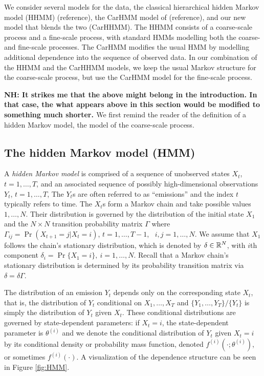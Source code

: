 %



We consider several models for the data, the classical hierarchical hidden Markov model (HHMM) (reference), the CarHMM model of (reference), and our new model that blends the two (CarHHMM).
The HHMM consists of a coarse-scale process and a fine-scale process, with standard HMMs modelling both the coarse- and fine-scale processes.
The CarHMM  modifies the usual HMM by modelling additional dependence into the sequence of observed data.
In our combination of the HHMM and the CarHHMM models, we keep the usual Markov structure for the coarse-scale process, but use the CarHMM model for the fine-scale process.

{\bf{NH: It strikes me that the above might belong in the introduction.  In that case, the what appears above in this section would be modified to something much shorter. 
}} 
We first remind the reader of the definition of a hidden Markov model,   the model of the coarse-scale process.

\subsection{The hidden Markov model (HMM)}

A \textit{hidden Markov model}  is comprised of a sequence of  unobserved states $X_t$, $t = 1, \ldots, T$, and an associated sequence of  possibly high-dimensional observations $Y_t$, $t = 1, \ldots, T$,
The $Y_t$s are often referred to as ``emissions'' and the index $t$ typically refers to time. 
 The $X_t$s form a Markov chain and take possible values $1, \ldots, N$. Their distribution is governed by the distribution of the initial state $X_1$ and the  $N \times N$ transition probability matrix $\Gamma$ where $\Gamma_{ij} = \Pr(X_{t+1} = j | X_t = i)$, $t=1,\ldots, T-1$, ~$i, j = 1,\ldots, N$. 
 We assume that $X_1$ follows the chain's stationary distribution, which is denoted by $\delta \in \mathbb{R}^N$, with $i$th component
$\delta_i = \Pr\{X_1 = i\},~ i = 1,\ldots,N.$
%
Recall that a Markov chain's stationary distribution is determined by its probability transition matrix via $\delta = \delta \Gamma$.

%
The distribution of an emission $Y_t$ depends only on the corresponding state $X_t$, that is, the distribution of  $Y_t$ conditional on $X_1,\ldots, X_T$ and $\{Y_1,\ldots, Y_T\}/ \{Y_t\}$ is simply the distribution of $Y_t$ given $X_t$.  
%
These conditional distributions are governed by state-dependent parameters:  if $X_t = i$, the state-dependent parameter is $\theta^{(i)}$ and we denote the conditional distribution of $Y_t$ given $X_t=i$ by its conditional density or probability mass function, denoted $f^{(i)}(\cdot ; \theta^{(i)})$, or sometimes  $f^{(i)}(\cdot)$.
%
A visualization of the dependence structure can be seen in Figure \ref{fig:HMM}.

